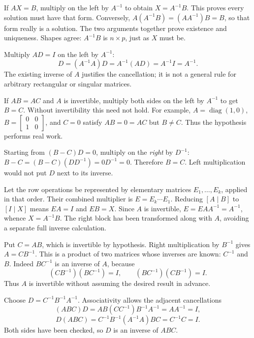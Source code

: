 If $AX=B$, multiply on the left by $A^{-1}$ to obtain $X=A^{-1}B$.
This proves every solution must have that form. Conversely,
$A(A^{-1}B)=(AA^{-1})B=B$, so that form really is a solution.
The two arguments together prove existence and uniqueness. Shapes agree:
$A^{-1}B$ is $n\times p$, just as $X$ must be.

Multiply $AD=I$ on the left by $A^{-1}$:
\[
 D=(A^{-1}A)D=A^{-1}(AD)=A^{-1}I=A^{-1}.
\]
The existing inverse of $A$ justifies the cancellation; it is not a general
rule for arbitrary rectangular or singular matrices.

If $AB=AC$ and $A$ is invertible, multiply both sides on the left by
$A^{-1}$ to get $B=C$. Without invertibility this need not hold.
For example, $A=\operatorname{diag}(1,0)$,
$B=\begin{bmatrix}0&0\\1&0\end{bmatrix}$, and $C=0$ satisfy
$AB=0=AC$ but $B\ne C$. Thus the hypothesis performs real work.

Starting from $(B-C)D=0$, multiply on the \emph{right} by $D^{-1}$:
$B-C=(B-C)(DD^{-1})=0D^{-1}=0$. Therefore $B=C$.
Left multiplication would not put $D$ next to its inverse.

Let the row operations be represented by elementary matrices
$E_1,\ldots,E_k$, applied in that order. Their combined multiplier is
$E=E_k\cdots E_1$. Reducing $[A\mid B]$ to $[I\mid X]$ means
$EA=I$ and $EB=X$. Since $A$ is invertible,
$E=EAA^{-1}=A^{-1}$, whence $X=A^{-1}B$.
The right block has been transformed along with $A$, avoiding a separate
full inverse calculation.

Put $C=AB$, which is invertible by hypothesis. Right multiplication by
$B^{-1}$ gives $A=CB^{-1}$. This is a product of two matrices whose
inverses are known: $C^{-1}$ and $B$.
Indeed $B C^{-1}$ is an inverse of $A$, because
\[
 (CB^{-1})(BC^{-1})=I,\qquad
 (BC^{-1})(CB^{-1})=I.
\]
Thus $A$ is invertible without assuming the desired result in advance.

Choose $D=C^{-1}B^{-1}A^{-1}$. Associativity allows the adjacent cancellations
\[
 (ABC)D=AB(CC^{-1})B^{-1}A^{-1}=AA^{-1}=I,
\]
\[
 D(ABC)=C^{-1}B^{-1}(A^{-1}A)BC=C^{-1}C=I.
\]
Both sides have been checked, so $D$ is an inverse of $ABC$.

